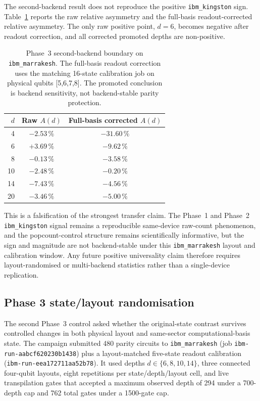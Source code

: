 \documentclass[reprint,aps,physrev,superscriptaddress,floatfix,longbibliography]{revtex4-2}
\begin{document}
The second-backend result does not reproduce the positive
\texttt{ibm\_kingston} sign. Table~\ref{tab:phase3} reports the raw
relative asymmetry and the full-basis readout-corrected relative
asymmetry. The only raw positive point, $d=6$, becomes negative after
readout correction, and all corrected promoted depths are
non-positive.

\begin{table}[tb]
\centering
\small
\begin{tabular}{rcc}
\toprule
$d$ & Raw $A(d)$ & Full-basis corrected $A(d)$ \\
\midrule
 4 & $-2.53\,\%$ & $-31.60\,\%$ \\
 6 & $+3.69\,\%$ & $-9.62\,\%$ \\
 8 & $-0.13\,\%$ & $-3.58\,\%$ \\
10 & $-2.48\,\%$ & $-0.20\,\%$ \\
14 & $-7.43\,\%$ & $-4.56\,\%$ \\
20 & $-3.46\,\%$ & $-5.00\,\%$ \\
\bottomrule
\end{tabular}
\caption{Phase~3 second-backend boundary on \texttt{ibm\_marrakesh}.
The full-basis readout correction uses the matching 16-state
calibration job on physical qubits [5,6,7,8]. The promoted conclusion
is backend sensitivity, not backend-stable parity protection.}
\label{tab:phase3}
\end{table}

This is a falsification of the strongest transfer claim. The Phase~1
and Phase~2 \texttt{ibm\_kingston} signal remains a reproducible
same-device raw-count phenomenon, and the popcount-control structure
remains scientifically informative, but the sign and magnitude are
not backend-stable under this \texttt{ibm\_marrakesh} layout and
calibration window. Any future positive universality claim therefore
requires layout-randomised or multi-backend statistics rather than a
single-device replication.

\subsection{Phase 3 state/layout randomisation}
\label{sec:phase3layout}

The second Phase~3 control asked whether the original-state contrast
survives controlled changes in both physical layout and same-sector
computational-basis state. The campaign submitted 480 parity circuits
to \texttt{ibm\_marrakesh} (job \texttt{ibm-run-aabcf620230b1438}) plus a
layout-matched five-state readout calibration
(\texttt{ibm-run-eea172711aa52b78}). It used depths
$d\in\{6,8,10,14\}$, three connected four-qubit layouts, eight
repetitions per state/depth/layout cell, and live transpilation gates
that accepted a maximum observed depth of 294 under a 700-depth cap
and 762 total gates under a 1500-gate cap.
\end{document}
